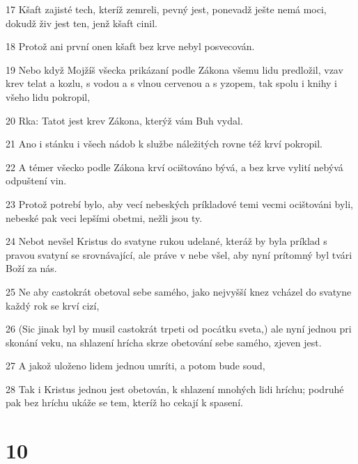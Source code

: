 \par 17 Kšaft zajisté tech, kteríž zemreli, pevný jest, ponevadž ješte nemá moci, dokudž živ jest ten, jenž kšaft cinil.
\par 18 Protož ani první onen kšaft bez krve nebyl posvecován.
\par 19 Nebo když Mojžíš všecka prikázaní podle Zákona všemu lidu predložil, vzav krev telat a kozlu, s vodou a s vlnou cervenou a s yzopem, tak spolu i knihy i všeho lidu pokropil,
\par 20 Rka: Tatot jest krev Zákona, kterýž vám Buh vydal.
\par 21 Ano i stánku i všech nádob k službe náležitých rovne též krví pokropil.
\par 22 A témer všecko podle Zákona krví ocištováno bývá, a bez krve vylití nebývá odpuštení vin.
\par 23 Protož potrebí bylo, aby vecí nebeských príkladové temi vecmi ocištováni byli, nebeské pak veci lepšími obetmi, nežli jsou ty.
\par 24 Nebot nevšel Kristus do svatyne rukou udelané, kteráž by byla príklad s pravou svatyní se srovnávající, ale práve v nebe všel, aby nyní prítomný byl tvári Boží za nás.
\par 25 Ne aby castokrát obetoval sebe samého, jako nejvyšší knez vcházel do svatyne každý rok se krví cizí,
\par 26 (Sic jinak byl by musil castokrát trpeti od pocátku sveta,) ale nyní jednou pri skonání veku, na shlazení hrícha skrze obetování sebe samého, zjeven jest.
\par 27 A jakož uloženo lidem jednou umríti, a potom bude soud,
\par 28 Tak i Kristus jednou jest obetován, k shlazení mnohých lidi hríchu; podruhé pak bez hríchu ukáže se tem, kteríž ho cekají k spasení.

\chapter{10}

